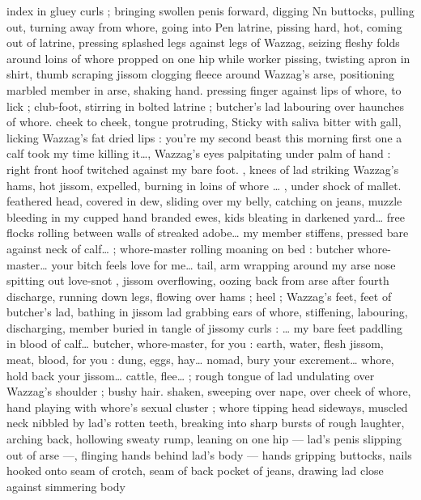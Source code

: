 {index in gluey curls ; bringing swollen penis forward, digging 
Nn buttocks, pulling out, turning away from whore, going into 
Pen latrine, pissing hard, hot, coming out of latrine, pressing 
splashed legs against legs of Wazzag, seizing fleshy folds around 
loins of whore propped on one hip while worker pissing, twisting 
apron in shirt, thumb scraping jissom clogging fleece around 
Wazzag's arse, positioning marbled member in arse, shaking hand. 
pressing finger against lips of whore, to lick ; club-foot, stirring in 
bolted latrine ; butcher's lad labouring over haunches of whore. 
cheek to cheek, tongue protruding, Sticky with saliva bitter with gall, 
licking Wazzag's fat dried lips : {\gl}{\td} you're my second beast this 
morning{\td} first one a calf{\td} took my time killing it{\ldots}{\gr}, Wazzag's eyes 
palpitating under palm of hand : {\gl}{\td} right front hoof twitched against 
my bare foot. {\gr}, knees of lad striking Wazzag's hams, hot jissom, 
expelled, burning in loins of whore {\ldots} {\gl}, under shock of mallet. 
feathered head, covered in dew, sliding over my belly, catching on 
jeans, muzzle bleeding in my cupped hand{\td} branded ewes, kids 
bleating in darkened yard{\ldots} free flocks rolling between walls of 
streaked adobe{\ldots} my member stiffens, pressed bare against neck of 
calf{\ldots}{\gr} ; whore-master rolling moaning on bed : {\gl} butcher{\td} whore- 
master{\ldots} your bitch feels love for me{\ldots} tail, arm wrapping around my 
arse{\td} nose spitting out love-snot{\td} {\gr}, jissom overflowing, oozing back 
from arse after fourth discharge, running down legs, flowing over 
hams ; heel ; Wazzag's feet, feet of butcher's lad, bathing in jissom 
lad grabbing ears of whore, stiffening, labouring, discharging, 
member buried in tangle of jissomy curls : {\gl}{\ldots} my bare feet paddling 
in blood of calf{\ldots} butcher, whore-master, for you : earth, water, flesh 
jissom, meat, blood, for you : dung, eggs, hay{\ldots} nomad, bury your 
excrement{\ldots} whore, hold back your jissom{\ldots} cattle, flee{\ldots} {\gr} ; rough 
tongue of lad undulating over Wazzag's shoulder ; bushy hair. 
shaken, sweeping over nape, over cheek of whore, hand playing with 
whore's sexual cluster ; whore tipping head sideways, muscled neck 
nibbled by lad's rotten teeth, breaking into sharp bursts of rough 
laughter, arching back, hollowing sweaty rump, leaning on one hip --- 
lad's penis slipping out of arse ---, flinging hands behind lad's body 
--- hands gripping buttocks, nails hooked onto seam of crotch, seam 
of back pocket of jeans, drawing lad close against simmering body 
}
